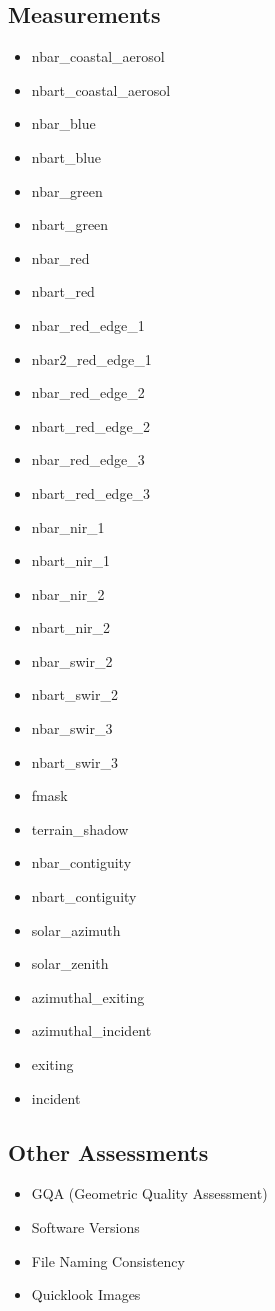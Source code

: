\documentclass[a4paper]{article}
\begin{document}
    \subsection{Measurements}
      \begin{itemize}
        \item nbar\_coastal\_aerosol
        \item nbart\_coastal\_aerosol
        \item nbar\_blue
        \item nbart\_blue
        \item nbar\_green
        \item nbart\_green
        \item nbar\_red
        \item nbart\_red
        \item nbar\_red\_edge\_1
        \item nbar2\_red\_edge\_1
        \item nbar\_red\_edge\_2
        \item nbart\_red\_edge\_2
        \item nbar\_red\_edge\_3
        \item nbart\_red\_edge\_3
        \item nbar\_nir\_1
        \item nbart\_nir\_1
        \item nbar\_nir\_2
        \item nbart\_nir\_2
        \item nbar\_swir\_2
        \item nbart\_swir\_2
        \item nbar\_swir\_3
        \item nbart\_swir\_3
        \item fmask
        \item terrain\_shadow
        \item nbar\_contiguity
        \item nbart\_contiguity
        \item solar\_azimuth
        \item solar\_zenith
        \item azimuthal\_exiting
        \item azimuthal\_incident
        \item exiting
        \item incident
      \end{itemize}

    \subsection{Other Assessments}
      \begin{itemize}
        \item GQA (Geometric Quality Assessment)
        \item Software Versions
        \item File Naming Consistency
        \item Quicklook Images
      \end{itemize}
\end{document}
